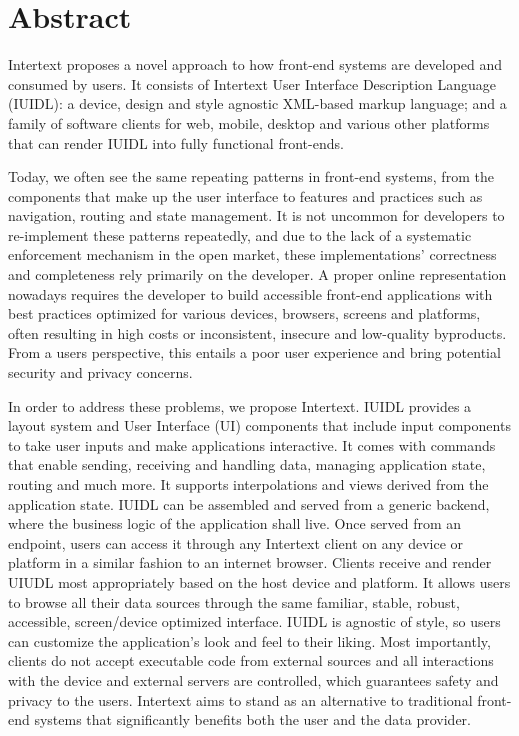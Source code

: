 

\section*{Abstract}

Intertext proposes a novel approach to how front-end systems are developed and consumed by users. It consists of Intertext User Interface Description Language (IUIDL): a device, design and style agnostic XML-based markup language; and a family of software clients for web, mobile, desktop and various other platforms that can render IUIDL into fully functional front-ends.

Today, we often see the same repeating patterns in front-end systems, from the components that make up the user interface to features and practices such as navigation, routing and state management. It is not uncommon for developers to re-implement these patterns repeatedly, and due to the lack of a systematic enforcement mechanism in the open market, these implementations' correctness and completeness rely primarily on the developer. A proper online representation nowadays requires the developer to build accessible front-end applications with best practices optimized for various devices, browsers, screens and platforms, often resulting in high costs or inconsistent, insecure and low-quality byproducts. From a users perspective, this entails a poor user experience and bring potential security and privacy concerns. 

In order to address these problems, we propose Intertext. IUIDL provides a layout system and User Interface (UI) components that include input components to take user inputs and make applications interactive. It comes with commands that enable sending, receiving and handling data, managing application state, routing and much more. It supports interpolations and views derived from the application state. IUIDL can be assembled and served from a generic backend, where the business logic of the application shall live. Once served from an endpoint, users can access it through any Intertext client on any device or platform in a similar fashion to an internet browser. Clients receive and render UIUDL most appropriately based on the host device and platform. It allows users to browse all their data sources through the same familiar, stable, robust, accessible, screen/device optimized interface. IUIDL is agnostic of style, so users can customize the application's look and feel to their liking. Most importantly, clients do not accept executable code from external sources and all interactions with the device and external servers are controlled, which guarantees safety and privacy to the users. Intertext aims to stand as an alternative to traditional front-end systems that significantly benefits both the user and the data provider.